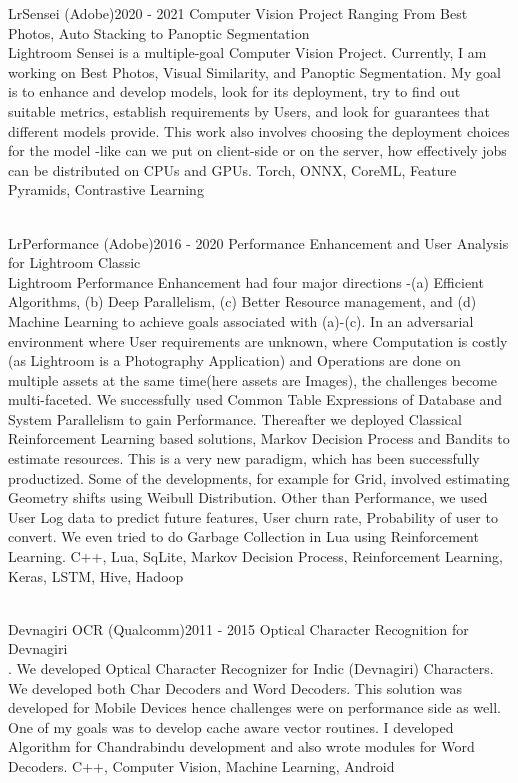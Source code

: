 %
%
%


\begin{projects}
	\project
	{LrSensei (Adobe)}{2020 - 2021}
	{Computer Vision Project Ranging From Best Photos, Auto Stacking to Panoptic Segmentation}
	{\\Lightroom Sensei is a multiple-goal Computer Vision Project. Currently, I am working on Best Photos, Visual Similarity, and Panoptic Segmentation. My goal is to enhance and develop models, look for its deployment, try to find out suitable metrics, establish requirements by Users, and look for guarantees that different models provide. This work also involves choosing the deployment choices for the model -like can we put on client-side or on the server, how effectively jobs can be distributed on CPUs and GPUs. }
	{Torch, ONNX, CoreML, Feature Pyramids, Contrastive Learning}
				
	\project
	{\\LrPerformance (Adobe)}{2016 - 2020}
	{Performance Enhancement and User Analysis for Lightroom Classic}
	{\\Lightroom Performance Enhancement had four major directions -(a) Efficient Algorithms, (b) Deep Parallelism, (c) Better Resource management, and (d) Machine Learning to achieve goals associated with (a)-(c). In an adversarial environment where User requirements are unknown, where Computation is costly (as Lightroom is a Photography Application) and Operations are done on multiple assets at the same time(here assets are Images), the challenges become multi-faceted. We successfully used Common Table Expressions of Database and System Parallelism to gain Performance. Thereafter we deployed Classical Reinforcement Learning based solutions, Markov Decision Process and Bandits to estimate resources. This is a very new paradigm, which has been successfully productized. Some of the developments, for example for Grid, involved estimating Geometry shifts using Weibull Distribution. Other than Performance, we used User Log data to predict future features, User churn rate, Probability of user to convert. We even tried to do Garbage Collection in Lua using Reinforcement Learning.}
	{C++, Lua, SqLite, Markov Decision Process, Reinforcement Learning, Keras, LSTM, Hive, Hadoop}
	
	\project
	{\\Devnagiri OCR (Qualcomm)}{2011 - 2015}
	{Optical Character Recognition for Devnagiri}
	{\\. We developed Optical Character Recognizer for Indic (Devnagiri) Characters. We developed both Char Decoders and Word Decoders. This solution was developed for Mobile Devices hence challenges were on performance side as well. One of my goals was to develop cache aware vector routines. I developed Algorithm for Chandrabindu development and also wrote modules for Word Decoders.}
	{C++, Computer Vision, Machine Learning, Android}	

\end{projects}